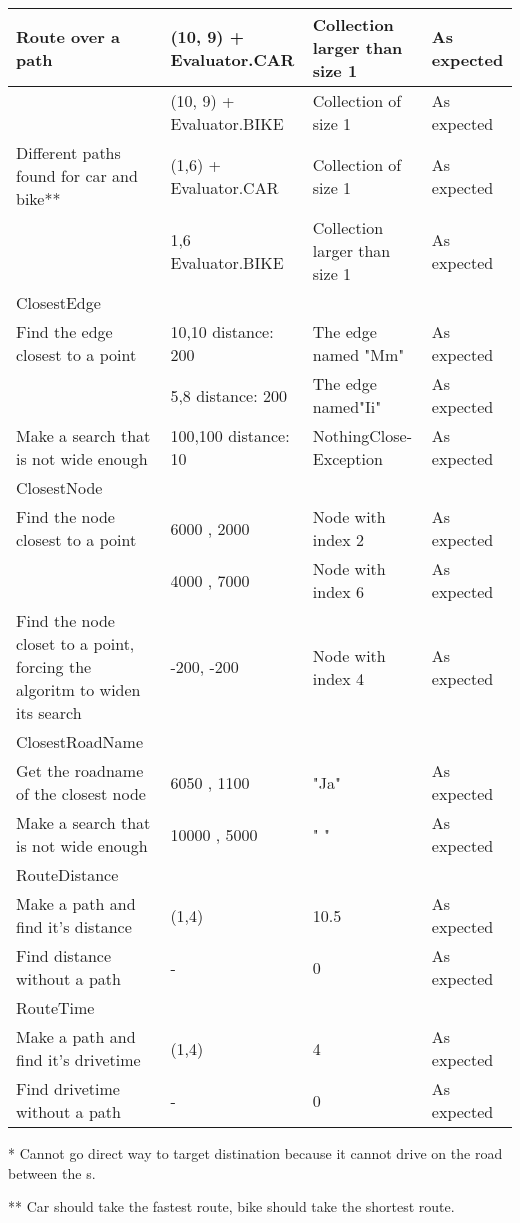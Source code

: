 \begin{centering}
\begin{longtable}{|p{}|p{}|p{}|p{}|}
\hline
Route over a path & (10, 9) + Evaluator.CAR & Collection larger than size 1 & As
expected\\
\hline
 & (10, 9) + Evaluator.BIKE & Collection of size 1 & As
expected\\
\hline
Different paths found for car and bike** & (1,6) + Evaluator.CAR & Collection of
size 1 & As expected\\
\hline
 & 1,6 Evaluator.BIKE & Collection larger than size 1 & As expected\\
\hline
\hline
ClosestEdge & & & \\
\hline
Find the edge closest to a point & 10,10 distance: 200 & The edge named "Mm" &
As expected\\
\hline
 & 5,8 distance: 200 & The edge named"Ii" & As expected\\
\hline
Make a search that is not wide enough & 100,100 distance: 10 &
NothingClose-Exception & As expected\\
\hline
\hline
ClosestNode & & & \\
\hline
Find the node closest to a point & 6000 , 2000 & Node with index 2 & As
expected\\
\hline
 & 4000 , 7000 & Node with index 6 & As expected\\
\hline
Find the node closet to a point, forcing the algoritm to widen its search &
-200, -200 & Node with index 4 & As expected\\
\hline
\hline
ClosestRoadName & & & \\
\hline
Get the roadname of the closest node & 6050 , 1100 & "Ja" & As expected\\
\hline
Make a search that is not wide enough & 10000 , 5000 & " " & As expected\\
\hline
\hline
RouteDistance & & & \\
\hline
Make a path and find it's distance & (1,4) & 10.5 & As expected\\
\hline
Find distance without a path & - & 0 & As expected\\
\hline
\hline
RouteTime & & & \\
\hline
Make a path and find it's drivetime & (1,4) & 4 & As expected\\
\hline
Find drivetime without a path & - & 0 & As expected\\
\hline
\end{longtable}
\end{centering}

* Cannot go direct way to target distination because it cannot drive on the road
between the s.

** Car should take the fastest route, bike should take the shortest route.